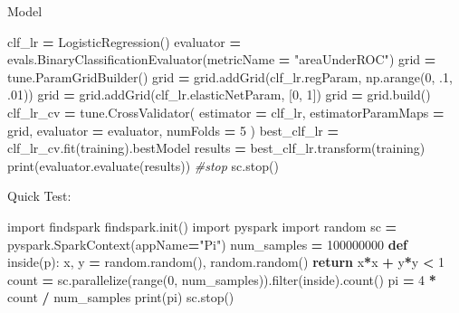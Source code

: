 \documentclass[]{book}
\newenvironment{Shaded}{\begin{snugshade}}{\end{snugshade}}
\newcommand{\KeywordTok}[1]{\textcolor[rgb]{0.13,0.29,0.53}{\textbf{#1}}}
\newcommand{\DecValTok}[1]{\textcolor[rgb]{0.00,0.00,0.81}{#1}}
\newcommand{\StringTok}[1]{\textcolor[rgb]{0.31,0.60,0.02}{#1}}
\newcommand{\ImportTok}[1]{#1}
\newcommand{\CommentTok}[1]{\textcolor[rgb]{0.56,0.35,0.01}{\textit{#1}}}
\newcommand{\ControlFlowTok}[1]{\textcolor[rgb]{0.13,0.29,0.53}{\textbf{#1}}}
\newcommand{\OperatorTok}[1]{\textcolor[rgb]{0.81,0.36,0.00}{\textbf{#1}}}
\newcommand{\BuiltInTok}[1]{#1}
\newcommand{\NormalTok}[1]{#1}
\begin{document}
Model

\begin{Shaded}
\begin{Highlighting}[]
\NormalTok{clf_lr }\OperatorTok{=}\NormalTok{ LogisticRegression()}
\NormalTok{evaluator }\OperatorTok{=}\NormalTok{ evals.BinaryClassificationEvaluator(metricName }\OperatorTok{=} \StringTok{"areaUnderROC"}\NormalTok{)}
\NormalTok{grid }\OperatorTok{=}\NormalTok{ tune.ParamGridBuilder()}
\NormalTok{grid }\OperatorTok{=}\NormalTok{ grid.addGrid(clf_lr.regParam, np.arange(}\DecValTok{0}\NormalTok{, .}\DecValTok{1}\NormalTok{, .}\DecValTok{01}\NormalTok{))}
\NormalTok{grid }\OperatorTok{=}\NormalTok{ grid.addGrid(clf_lr.elasticNetParam, [}\DecValTok{0}\NormalTok{, }\DecValTok{1}\NormalTok{])}
\NormalTok{grid }\OperatorTok{=}\NormalTok{ grid.build()}
\NormalTok{clf_lr_cv }\OperatorTok{=}\NormalTok{ tune.CrossValidator(}
\NormalTok{    estimator }\OperatorTok{=}\NormalTok{ clf_lr,}
\NormalTok{    estimatorParamMaps }\OperatorTok{=}\NormalTok{ grid,}
\NormalTok{    evaluator }\OperatorTok{=}\NormalTok{ evaluator,}
\NormalTok{    numFolds }\OperatorTok{=} \DecValTok{5}
\NormalTok{               )}
\NormalTok{best_clf_lr }\OperatorTok{=}\NormalTok{ clf_lr_cv.fit(training).bestModel}
\NormalTok{results }\OperatorTok{=}\NormalTok{ best_clf_lr.transform(training)}
\BuiltInTok{print}\NormalTok{(evaluator.evaluate(results))}
\CommentTok{#stop}
\NormalTok{sc.stop()}
\end{Highlighting}
\end{Shaded}

Quick Test:

\begin{Shaded}
\begin{Highlighting}[]
\ImportTok{import}\NormalTok{ findspark}
\NormalTok{findspark.init()}
\ImportTok{import}\NormalTok{ pyspark}
\ImportTok{import}\NormalTok{ random}
\NormalTok{sc }\OperatorTok{=}\NormalTok{ pyspark.SparkContext(appName}\OperatorTok{=}\StringTok{"Pi"}\NormalTok{)}
\NormalTok{num_samples }\OperatorTok{=} \DecValTok{100000000}
\KeywordTok{def}\NormalTok{ inside(p):     }
\NormalTok{    x, y }\OperatorTok{=}\NormalTok{ random.random(), random.random()}
    \ControlFlowTok{return}\NormalTok{ x}\OperatorTok{*}\NormalTok{x }\OperatorTok{+}\NormalTok{ y}\OperatorTok{*}\NormalTok{y }\OperatorTok{<} \DecValTok{1}
\NormalTok{count }\OperatorTok{=}\NormalTok{ sc.parallelize(}\BuiltInTok{range}\NormalTok{(}\DecValTok{0}\NormalTok{, num_samples)).}\BuiltInTok{filter}\NormalTok{(inside).count()}
\NormalTok{pi }\OperatorTok{=} \DecValTok{4} \OperatorTok{*}\NormalTok{ count }\OperatorTok{/}\NormalTok{ num_samples}
\BuiltInTok{print}\NormalTok{(pi)}
\NormalTok{sc.stop()}
\end{Highlighting}
\end{Shaded}
\end{document}
